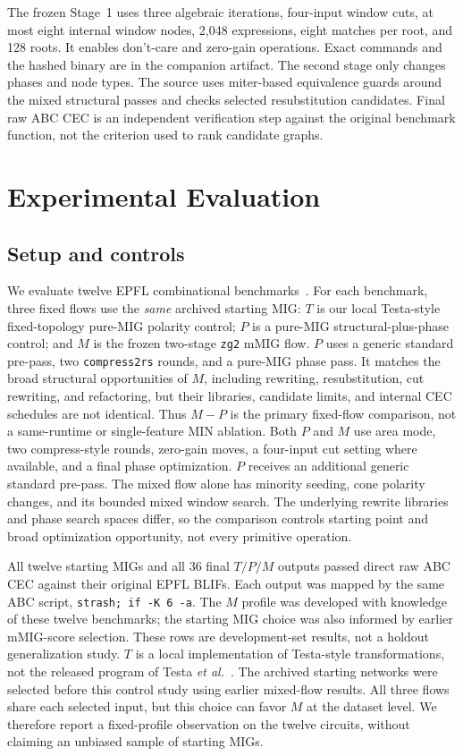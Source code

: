 \documentclass[10pt,journal]{IEEEtran}
\begin{document}
The frozen Stage~1 uses three algebraic iterations, four-input window
cuts, at most eight internal window nodes, 2,048 expressions, eight
matches per root, and 128 roots. It enables don't-care and zero-gain
operations. Exact commands and the hashed binary are in the companion
artifact. The second stage only changes phases and node types.
The source uses miter-based equivalence guards around the mixed
structural passes and checks selected resubstitution candidates. Final
raw ABC CEC is an independent verification step against the original
benchmark function, not the criterion used to rank candidate graphs.

\section{Experimental Evaluation}
\label{sec:eval}
\subsection{Setup and controls}
We evaluate twelve EPFL combinational benchmarks~\cite{epfl2015}.
For each benchmark, three fixed flows use the \emph{same} archived starting
MIG: $T$ is our local Testa-style fixed-topology pure-MIG polarity control;
$P$ is a pure-MIG structural-plus-phase control; and $M$ is the frozen
two-stage \texttt{zg2} mMIG flow. $P$ uses a generic standard pre-pass,
two \texttt{compress2rs} rounds, and a pure-MIG phase pass. It matches
the broad structural opportunities of $M$, including rewriting,
resubstitution, cut rewriting, and refactoring, but their libraries,
candidate limits, and internal CEC schedules are not identical. Thus
$M-P$ is the primary fixed-flow comparison, not a same-runtime or
single-feature MIN ablation.
Both $P$ and $M$ use area mode, two compress-style rounds, zero-gain
moves, a four-input cut setting where available, and a final phase
optimization. $P$ receives an additional generic standard pre-pass.
The mixed flow alone has minority seeding, cone polarity changes, and
its bounded mixed window search. The underlying rewrite libraries and
phase search spaces differ, so the comparison controls starting point
and broad optimization opportunity, not every primitive operation.

All twelve starting MIGs and all 36 final $T/P/M$ outputs passed direct
raw ABC CEC against their original EPFL BLIFs. Each output was mapped by
the same ABC script, \texttt{strash; if -K 6 -a}. The $M$ profile was
developed with knowledge of these twelve benchmarks; the starting MIG
choice was also informed by earlier mMIG-score selection. These rows
are development-set results, not a holdout generalization study. $T$
is a local implementation of Testa-style transformations, not the
released program of Testa \emph{et al.}~\cite{testa2016inv}.
The archived starting networks were selected before this control
study using earlier mixed-flow results. All three flows share each
selected input, but this choice can favor $M$ at the dataset level.
We therefore report a fixed-profile observation on the twelve circuits,
without claiming an unbiased sample of starting MIGs.
\end{document}
